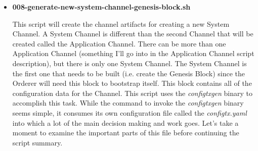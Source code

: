 \begin{itemize}
				\item \textbf{008-generate-new-system-channel-genesis-block.sh}
					
					\hspace{10mm}This script will create the channel artifacts for creating a new System Channel. A System Channel is different than the second Channel that will be created called the Application Channel. There can be more than one Application Channel (something I'll go into in the Application Channel script description), but there is only one System Channel. The System Channel is the first one that needs to be built (i.e. create the Genesis Block) since the Orderer will need this block to bootstrap itself. This block contains all of the configuration data for the Channel. This script uses the \textit{configtxgen} binary to accomplish this task. While the command to invoke the \textit{configtxgen} binary seems simple, it consumes its own configuration file called the \textit{configtx.yaml} into which a lot of the main decision making and work goes. Let's take a moment to examine the important parts of this file before continuing the script summary.\\
					

\end{itemize}

